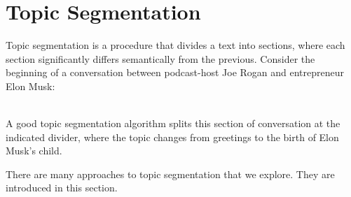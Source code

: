 \section{Topic Segmentation \label{ssec: topic segmentation}}
Topic segmentation is a procedure that divides a text into sections, where each section significantly differs semantically from the previous. 
Consider the beginning of a conversation between podcast-host Joe Rogan and entrepreneur Elon Musk:\\


\vspace{1em} 
\hspace{2.5em} 
\vspace{1em}
        
\vspace{-0.3em}\\

\noindent A good topic segmentation algorithm splits this section of conversation at the indicated divider, where the topic changes from greetings to the birth of Elon Musk's child.


There are many approaches to topic segmentation that we explore. They are introduced in this section.

    
